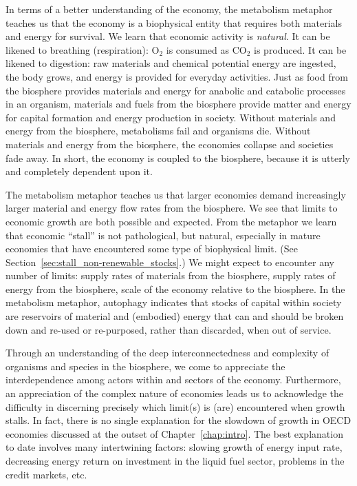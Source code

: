 In terms of a better understanding of the economy, 
the metabolism metaphor teaches us that the economy is a biophysical entity
that requires both materials and energy for survival.
We learn that economic activity is \emph{natural}.
It can be likened to breathing (respiration): 
O$_2$ is consumed as CO$_2$ is produced.
It can be likened to digestion:
raw materials and chemical potential energy are ingested, 
the body grows, 
and energy is provided for everyday activities.
Just as food from the biosphere provides materials and energy for
anabolic and catabolic processes in an organism, 
materials and fuels from the biosphere provide matter and energy for
capital formation and energy production in society.
Without materials and energy from the biosphere, 
metabolisms fail and organisms die. 
Without materials and energy from the biosphere,
the economies collapse and societies fade away.
In short, the economy is coupled to the biosphere,
because it is utterly and completely dependent upon it.

The metabolism metaphor teaches us that 
larger economies demand increasingly larger
material and energy flow rates from the biosphere.
We see that limits to economic growth
are both possible and expected.
From the metaphor we learn that economic ``stall'' is not pathological, 
but natural, especially in mature economies 
that have encountered some type of biophysical limit.
(See Section~\ref{sec:stall_non-renewable_stocks}.)
We might expect to encounter any number of limits:
supply rates of materials from the biosphere,
supply rates of energy from the biosphere,
scale of the economy relative to the biosphere.
In the metabolism metaphor, autophagy indicates that stocks 
of capital within society are reservoirs of 
material and (embodied) energy that can and should be 
broken down and re-used or re-purposed,
rather than discarded, 
when out of service.

Through an understanding of the deep interconnectedness and complexity
of organisms and species in the biosphere, 
we come to appreciate the interdependence 
among actors within and sectors of the economy.
Furthermore, an appreciation of the complex nature of economies leads us 
to acknowledge the difficulty in discerning
precisely which limit(s) is (are) encountered when growth stalls.
In fact, there is no single explanation 
for the slowdown of growth in OECD economies 
discussed at the outset of Chapter~\ref{chap:intro}.
The best explanation to date involves many intertwining factors: 
slowing growth of energy input rate, 
decreasing energy return on investment in the liquid fuel sector,
problems in the credit markets, etc.

